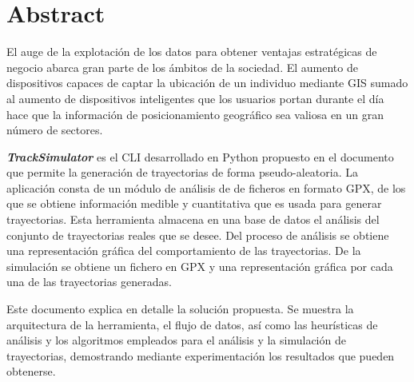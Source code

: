 
\chapter{Abstract}

El auge de la explotación de los datos para obtener ventajas estratégicas de negocio abarca gran parte de los ámbitos de la sociedad. El aumento de dispositivos capaces de  captar la ubicación de un individuo mediante \ac{GIS} sumado al aumento de dispositivos inteligentes que los usuarios portan durante el día hace que la  información de posicionamiento geográfico sea valiosa en un gran número de sectores. 

\textit{\textbf{TrackSimulator}} es el \ac{CLI} desarrollado en Python propuesto en el documento que permite la generación de trayectorias de forma pseudo-aleatoria. La aplicación consta de un módulo de análisis de de ficheros en formato \ac{GPX}, de los que se obtiene información medible y cuantitativa que es usada para generar trayectorias. Esta herramienta almacena en una base de datos el análisis del conjunto de trayectorias reales que se desee. Del proceso de análisis se obtiene una representación gráfica del comportamiento de las trayectorias. De la simulación se obtiene un fichero en \ac{GPX} y una representación gráfica por cada una de las trayectorias generadas.

Este documento explica en detalle la solución propuesta. Se muestra la arquitectura de la herramienta, el flujo de datos, así como las heurísticas de análisis y los algoritmos empleados para el análisis y la simulación de trayectorias, demostrando mediante experimentación los resultados que pueden obtenerse.
